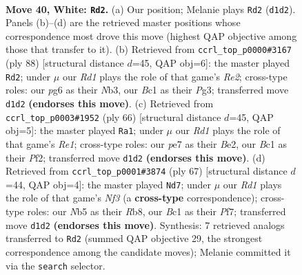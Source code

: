 \documentclass[11pt]{article}
\begin{document}
\clearpage

\begin{figure}[p]\centering
\begin{subfigure}{0.46\textwidth}\centering
\resizebox{\linewidth}{!}{%
\newchessgame
\chessboard[
  setfen={5k2/1p2p1rp/n5p1/pNp5/5P1P/2P2P2/P7/n1BR1K2 w - - 5 40},
  showmover=false,
  pgfstyle=straightmove, color=movearrow, markmove={d1-d2}
]}
\caption{}
\end{subfigure}\hfill
\begin{subfigure}{0.46\textwidth}\centering
\resizebox{\linewidth}{!}{%
\newchessgame
\chessboard[
  setfen={4nk2/p1r2p2/1p4p1/6Pp/8/1N4PP/PP2R1K1/8 w - - 1 45},
  showmover=false,
  pgfstyle=straightmove, color=movearrow, markmove={e2-d2}
]}
\caption{}
\end{subfigure}
\\[4pt]
\begin{subfigure}{0.46\textwidth}\centering
\resizebox{\linewidth}{!}{%
\newchessgame
\chessboard[
  setfen={2b5/p3r2k/4p1pp/3pP3/2p4P/2P5/2P1BPP1/4R1K1 w - - 0 34},
  showmover=false,
  pgfstyle=straightmove, color=movearrow, markmove={e1-a1}
]}
\caption{}
\end{subfigure}\hfill
\begin{subfigure}{0.46\textwidth}\centering
\resizebox{\linewidth}{!}{%
\newchessgame
\chessboard[
  setfen={1r4k1/1p3p2/5n2/pP4p1/P1P5/5P1b/3NRK2/7B b - - 0 34},
  showmover=false,
  pgfstyle=straightmove, color=movearrow, markmove={f6-d7}
]}
\caption{}
\end{subfigure}
\caption{\textbf{Move 40, White: \texttt{Rd2}.} (a) Our position; Melanie plays \texttt{Rd2} (\texttt{d1d2}). Panels (b)--(d) are the retrieved master positions whose correspondence most drove this move (highest QAP objective among those that transfer to it). (b) Retrieved from \texttt{ccrl\_top\_p0000\#3167} (ply 88) [structural distance $d$=45, QAP obj=6]: the master played \texttt{Rd2}; under $\mu$ our \emph{Rd1} plays the role of that game's \emph{Re2}; cross-type roles: our \emph{p}g6 as their \emph{N}b3, our \emph{B}c1 as their \emph{P}g3; transferred move \texttt{d1d2} \textbf{(endorses this move)}. (c) Retrieved from \texttt{ccrl\_top\_p0003\#1952} (ply 66) [structural distance $d$=45, QAP obj=5]: the master played \texttt{Ra1}; under $\mu$ our \emph{Rd1} plays the role of that game's \emph{Re1}; cross-type roles: our \emph{p}e7 as their \emph{B}e2, our \emph{B}c1 as their \emph{P}f2; transferred move \texttt{d1d2} \textbf{(endorses this move)}. (d) Retrieved from \texttt{ccrl\_top\_p0001\#3874} (ply 67) [structural distance $d$=44, QAP obj=4]: the master played \texttt{Nd7}; under $\mu$ our \emph{Rd1} plays the role of that game's \emph{Nf3} (a \textbf{cross-type} correspondence); cross-type roles: our \emph{N}b5 as their \emph{R}b8, our \emph{B}c1 as their \emph{P}f7; transferred move \texttt{d1d2} \textbf{(endorses this move)}. Synthesis: 7 retrieved analogs transferred to \texttt{Rd2} (summed QAP objective 29, the strongest correspondence among the candidate moves); Melanie committed it via the \texttt{search} selector.}
\label{fig:thought-m78}
\end{figure}
\end{document}
